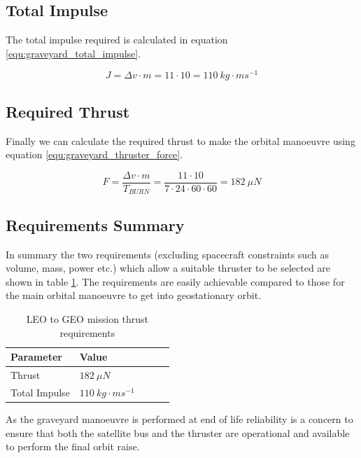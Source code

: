 \documentclass[a4paper, article, oneside, UKenglish]{memoir}
\newcommand{\0}{\mathbf{0}}
\newcommand{\1}{\mathbf{1}}
\begin{document}
\subsection{Total Impulse}

The total impulse required is calculated in equation \ref{equ:graveyard_total_impulse}.

\begin{equation}
J = \Delta v \cdot m = 11 \cdot 10 = 110 ~ kg \cdot ms^{-1}
\label{equ:graveyard_total_impulse}
\end{equation}


\subsection{Required Thrust}

Finally we can calculate the required thrust to make the orbital manoeuvre using equation \ref{equ:graveyard_thruster_force}.

\begin{equation}
F = \frac{\Delta v \cdot m}{T_{BURN}} = \frac{11 \cdot 10}{7 \cdot 24 \cdot 60 \cdot 60} = 182 ~ \mu N
\label{equ:graveyard_thruster_force}
\end{equation}

\subsection{Requirements Summary}

In summary the two requirements (excluding spacecraft constraints such as volume, mass, power etc.) which allow a suitable thruster to be selected are shown in table \ref{tab:graveyard_thruster_requirements}.  The requirements are easily achievable compared to those for the main orbital manoeuvre to get into geostationary orbit.

\begin{table}[h]
\centering
\begin{tabular}{@{}lllll@{}}
\toprule
Parameter					& Value							\\ \midrule
Thrust						& $182~\mu N$					\\
Total Impulse				& $110~kg \cdot ms^{-1}$		\\ \bottomrule
\end{tabular}
\captionsetup{justification=centering}
\caption{LEO to GEO mission thrust requirements}
\label{tab:graveyard_thruster_requirements}
\end{table}

As the graveyard manoeuvre is performed at end of life reliability is a concern to ensure that both the satellite bus and the thruster are operational and available to perform the final orbit raise. 
\end{document}

